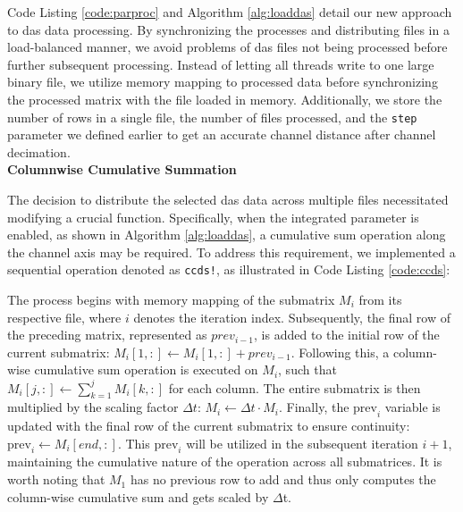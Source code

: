 Code Listing \ref{code:parproc} and Algorithm \ref{alg:loaddas} detail our new approach to \acrshort{das} data processing. By synchronizing the processes and distributing files in a load-balanced manner, we avoid problems of \acrshort{das} files not being processed before further subsequent processing. Instead of letting all threads write to one large binary file, we utilize memory mapping \cite{mmap_article} to processed data before synchronizing the processed matrix with the file loaded in memory.
%
Additionally, we store the number of rows in a single file, the number of files processed, and the \texttt{step} parameter we defined earlier to get an accurate channel distance after channel decimation.\\
%  
%  

\clearpage
\textbf{Columnwise Cumulative Summation}

The decision to distribute the selected \acrshort{das} data across multiple files necessitated modifying a crucial function. Specifically, when the integrated parameter is enabled, as shown in Algorithm \ref{alg:loaddas}, a cumulative sum operation along the channel axis may be required. To address this requirement, we implemented a sequential operation denoted as \texttt{ccds!}, as illustrated in Code Listing \ref{code:ccds}:



The process begins with memory mapping of the submatrix $M_i$ from its respective file, where $i$ denotes the iteration index. Subsequently, the final row of the preceding matrix, represented as $prev_{i-1}$, is added to the initial row of the current submatrix: $M_i[1,:] \leftarrow M_i[1,:] + prev_{i-1}$. Following this, a column-wise cumulative sum operation is executed on $M_i$, such that $M_i[j,:] \leftarrow \sum_{k=1}^j M_i[k,:]$ for each column. The entire submatrix is then multiplied by the scaling factor $\Delta t$: $M_i \leftarrow \Delta t \cdot M_i$. Finally, the $\text{prev}_i$ variable is updated with the final row of the current submatrix to ensure continuity: $\text{prev}_i \leftarrow M_i[end,:]$. This $\text{prev}_i$ will be utilized in the subsequent iteration $i+1$, maintaining the cumulative nature of the operation across all submatrices. It is worth noting that $M_1$ has no previous row to add and thus only computes the column-wise cumulative sum and gets scaled by $\Delta$t.

